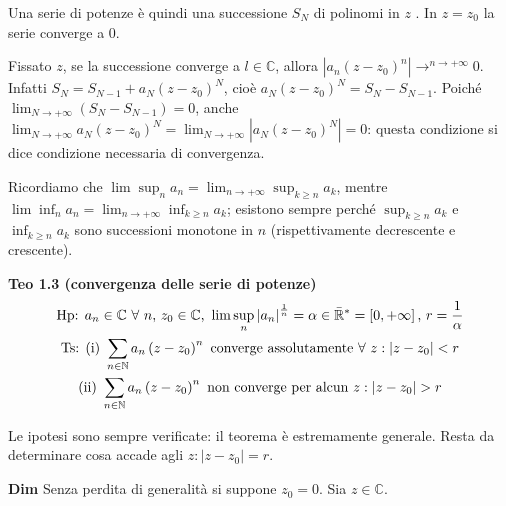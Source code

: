 \documentclass{article}
\begin{document}
Una serie di potenze \`{e} quindi una successione $S_{N}$ di polinomi in $z$%
. In $z=z_{0}$ la serie converge a $0$.

Fissato $z$, se la successione converge a $l\in 
\mathbb{C}
$, allora $\left\vert a_{n}\left( z-z_{0}\right) ^{n}\right\vert \rightarrow
^{n\rightarrow +\infty }0$. Infatti $S_{N}=S_{N-1}+a_{N}\left(
z-z_{0}\right) ^{N}$, cio\`{e} $a_{N}\left( z-z_{0}\right)
^{N}=S_{N}-S_{N-1} $. Poich\'{e} $\lim_{N\rightarrow +\infty }\left(
S_{N}-S_{N-1}\right) =0$, anche $\lim_{N\rightarrow +\infty }a_{N}\left(
z-z_{0}\right) ^{N}=\lim_{N\rightarrow +\infty }\left\vert a_{N}\left(
z-z_{0}\right) ^{N}\right\vert =0$: questa condizione si dice condizione
necessaria di convergenza.

Ricordiamo che $\lim \sup_{n}a_{n}=\lim_{n\rightarrow +\infty }\sup_{k\geq
n}a_{k}$, mentre $\lim \inf_{n}a_{n}=\lim_{n\rightarrow +\infty }\inf_{k\geq
n}a_{k}$; esistono sempre perch\'{e} $\sup_{k\geq n}a_{k}$ e $\inf_{k\geq
n}a_{k}$ sono successioni monotone in $n$ (rispettivamente decrescente e
crescente).

\textbf{Teo 1.3 (convergenza delle serie di potenze) }%
\begin{gather*}
\text{Hp: }a_{n}\in 
\mathbb{C}
\text{ }\forall \text{ }n\text{, }z_{0}\in 
\mathbb{C}
\text{, }\lim \sup_{n}\left\vert a_{n}\right\vert ^{\frac{1}{n}}=\alpha \in 
\bar{%
\mathbb{R}%
}^{\ast }=\left[ 0,+\infty \right] \text{, }r=\frac{1}{\alpha } \\
\text{Ts: (i) }\sum_{n\in 
\mathbb{N}
}a_{n}\left( z-z_{0}\right) ^{n}\text{ converge assolutamente }\forall \text{
}z:\left\vert z-z_{0}\right\vert <r \\
\text{(ii) }\sum_{n\in 
\mathbb{N}
}a_{n}\left( z-z_{0}\right) ^{n}\text{ non converge per alcun }z:\left\vert
z-z_{0}\right\vert >r
\end{gather*}

Le ipotesi sono sempre verificate: il teorema \`{e} estremamente generale.
Resta da determinare cosa accade agli $z:\left\vert z-z_{0}\right\vert =r$.

\textbf{Dim} Senza perdita di generalit\`{a} si suppone $z_{0}=0$. Sia $z\in 
\mathbb{C}
$.
\end{document}
